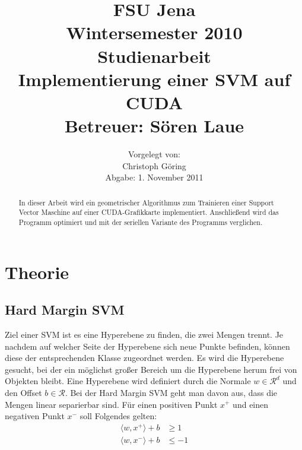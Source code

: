 \documentclass[ngerman]{scrartcl}
\title{%
\large FSU Jena\\
Wintersemester 2010\\
Studienarbeit \\[10mm]
{\LARGE Implementierung einer SVM auf CUDA}\\[10mm]
Betreuer: Sören Laue}
\author{%
Vorgelegt von:\\[10mm]
Christoph Göring\\
Abgabe: 1. November 2011\\
}
\date{}
\begin{document}

\maketitle
\begin{abstract}
In dieser Arbeit wird ein geometrischer Algorithmus zum Trainieren einer Support Vector Maschine auf einer CUDA-Grafikkarte implementiert. Anschließend wird das Programm optimiert und mit der seriellen Variante des Programms verglichen.
\end{abstract}

\clearpage
\tableofcontents
\clearpage
\listoftables
\clearpage


\section{Theorie}
\subsection{Hard Margin SVM}
Ziel einer SVM ist es eine Hyperebene zu finden, die zwei Mengen trennt.
Je nachdem auf welcher Seite der Hyperebene sich neue Punkte befinden, können diese der entsprechenden Klasse zugeordnet werden.
Es wird die Hyperebene gesucht, bei der ein möglichst großer Bereich um die Hyperebene herum frei von Objekten bleibt.
Eine Hyperebene wird definiert durch die Normale $w \in \mathcal R^d$ und den Offset $b \in \mathcal R$.
Bei der Hard Margin SVM geht man davon aus, dass die Mengen linear separierbar sind.
Für einen positiven Punkt $x^+$ und einen negativen Punkt $x^-$ soll Folgendes gelten:
\begin{align}
\langle w , x^+ \rangle + b &\ge 1 \\
\langle w , x^- \rangle + b &\le -1 
\end{align}
\end{document}
